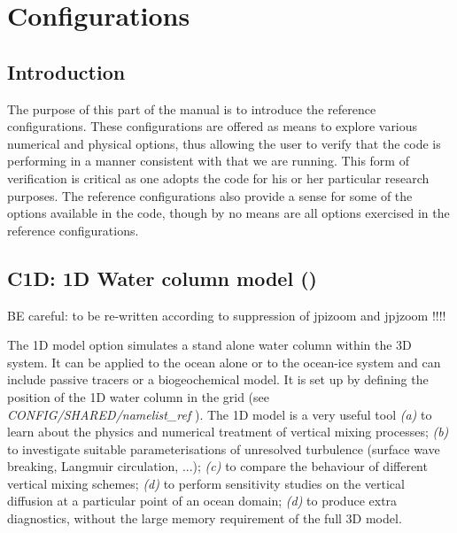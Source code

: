 \documentclass[../main/NEMO_manual]{subfiles}
\begin{document}
\chapter{Configurations}
\label{chap:CFG}

\minitoc

\newpage

\section{Introduction}
\label{sec:CFG_intro}

The purpose of this part of the manual is to introduce the \NEMO reference configurations.
These configurations are offered as means to explore various numerical and physical options,
thus allowing the user to verify that the code is performing in a manner consistent with that we are running.
This form of verification is critical as one adopts the code for his or her particular research purposes.
The reference configurations also provide a sense for some of the options available in the code,
though by no means are all options exercised in the reference configurations.



\section{C1D: 1D Water column model (\protect{}) }
\label{sec:CFG_c1d}

BE careful: to be re-written according to suppression of jpizoom and jpjzoom !!!!

The 1D model option simulates a stand alone water column within the 3D \NEMO system.
It can be applied to the ocean alone or to the ocean-ice system and can include passive tracers or a biogeochemical model.
It is set up by defining the position of the 1D water column in the grid
(see \textit{CONFIG/SHARED/namelist\_ref} ). 
The 1D model is a very useful tool
\textit{(a)} to learn about the physics and numerical treatment of vertical mixing processes;
\textit{(b)} to investigate suitable parameterisations of unresolved turbulence
(surface wave breaking, Langmuir circulation, ...);
\textit{(c)} to compare the behaviour of different vertical mixing schemes;
\textit{(d)} to perform sensitivity studies on the vertical diffusion at a particular point of an ocean domain;
\textit{(d)} to produce extra diagnostics, without the large memory requirement of the full 3D model.
\end{document}
